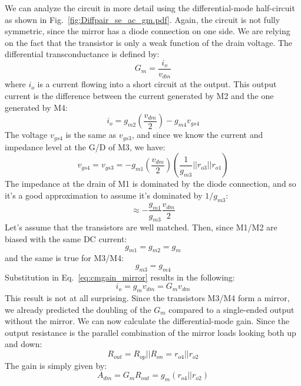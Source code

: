 We can analyze the circuit in more detail using the differential-mode half-circuit as shown in Fig.~\ref{fig:Diffpair_se_ac_gm.pdf}.  Again, the circuit is not fully symmetric, since the mirror has a diode connection on one side.  We are relying on the fact that the transistor is only a weak function of the drain voltage.  The differential transconductance is defined by:
%
\begin{equation}
	{G_m} = \frac{{{i_o}}}{{{v_{dm}}}}
\end{equation}
%
where $i_o$ is a current flowing into a short circuit at the output.  This output current is the difference between the current generated by M2 and the one generated by M4:
%
\begin{equation}
	{i_o} = {g_{m2}}\left( {\frac{{{v_{dm}}}}{2}} \right) - {g_{m4}}{v_{gs4}}
	\label{eq:cmgain_mirror}
\end{equation}
%
The voltage $v_{gs4}$ is the same as $v_{gs3}$, and since we know the current and impedance level at the G/D of M3, we have:
%
\begin{equation}
	{v_{gs4}} = {v_{gs3}} =  - {g_{m1}}\left( {\frac{{{v_{dm}}}}{2}} \right)
		\left( {\frac{1}{{{g_{m3}}}}||{r_{o3}}||{r_{o1}}} \right) 
\end{equation}
%
The impedance at the drain of M1 is dominated by the diode connection, and so it's a good approximation to assume it's dominated by $1/g_{m3}$:
%
\begin{equation}
		\approx  - \frac{{{g_{m1}}}}{{{g_{m3}}}}\frac{{{v_{dm}}}}{2}
\end{equation}
%
Let's assume that the transistors are well matched.  Then, since M1/M2 are biased with the same DC current:
\begin{equation}
	{g_{m1}} = {g_{m2}} = {g_m}
\end{equation}
and the same is true for M3/M4:
%
\begin{equation}
	{g_{m3}} = {g_{m4}}
\end{equation}
%
Substitution in Eq.~\ref{eq:cmgain_mirror} results in the following:
\begin{equation}
	{i_o} = {g_m}{v_{dm}} = G_m v_{dm}
\end{equation}
%
This result is not at all surprising.  Since the transistors M3/M4 form a mirror, we already predicted the doubling of the $G_m$ compared to a single-ended output without the mirror.
%
We can now calculate the differential-mode gain.  Since the output resistance is the parallel combination of the mirror loads looking both up and down:
%
\begin{equation}
	{R_{out}} = {R_{op}}||{R_{on}} = {r_{o4}}||{r_{o2}}
\end{equation}
%
The gain is simply given by:
%
\begin{equation}
	{A_{dm}} = {G_m}{R_{out}} = {g_m}\left( {{r_{o4}}||{r_{o2}}} \right)
\end{equation}




